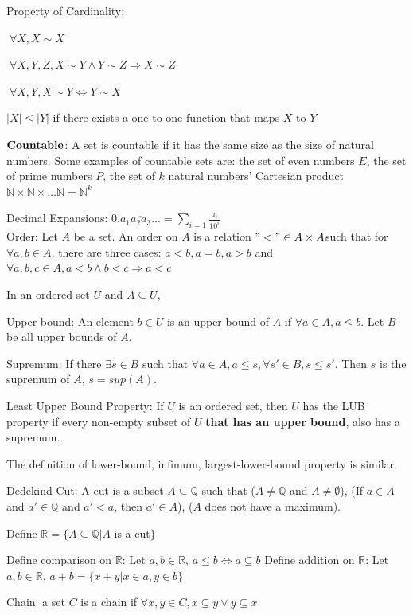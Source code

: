 \documentclass[12pt,a4paper]{ctexrep}
\begin{document}
Property of Cardinality: 

$\;\forall X, X \sim X$

$\;\forall X,Y,Z, X\sim Y \wedge Y\sim Z \Rightarrow X \sim Z$

$\;\forall X,Y, X\sim Y \Leftrightarrow Y \sim X$

$|X|\leqslant|Y|$ if there exists a one to one function that maps $X$ to $Y$

$\bold{Countable}$: A set is countable if it has the same size as the size of natural numbers. Some examples of countable sets are: the set of even numbers $E$, the set of prime numbers $P$, the set of $k$ natural numbers' Cartesian product $\mathbb{N} \times \mathbb{N} \times \dots\mathbb{N} = \mathbb{N}^k$

Decimal Expansions: 0.$\overline{a_1a_2a_3\dots} = \sum_{i=1} \frac{a_i}{10^i}$\\

Order: Let $A$ be a set. An order on $A$ is a relation $"<"\in A\times A$such that for $\forall a,b \in A$, there are three cases: $a<b,a=b,a>b$ and $\forall a,b,c \in A, a<b \wedge b<c \Rightarrow a<c$

In an ordered set $U$ and $A \subseteq U$,

Upper bound: An element $b \in U$ is an upper bound of $A$ if $\forall a \in A, a \leqslant b$. Let $B$ be all upper bounds of $A$.

Supremum: If there $\exists s \in B$ such that $\forall a \in A, a \leqslant s, \forall s' \in B, s \leqslant s'$. Then $s$ is the supremum of $A$, $s = sup(A)$.

Least Upper Bound Property: If $U$ is an ordered set, then $U$ has the LUB property if every non-empty subset of $U$ \textbf{that has an upper bound}, also has a supremum.

The definition of lower-bound, infimum, largest-lower-bound property is similar.

Dedekind Cut: A cut is a subset $A \subseteq \mathbb{Q}$ such that ($A \neq \mathbb{Q}$ and $A \neq \emptyset$), (If $a \in A$ and $a' \in \mathbb{Q}$ and $a' < a$, then $a' \in A$), ($A$ does not have a maximum).

Define $\mathbb{R} = \{A \subseteq \mathbb{Q}|A$ is a cut$\}$

Define comparison on $\mathbb{R}$: Let $a,b \in \mathbb{R}$, $a \leqslant b \iff a \subseteq b$
Define addition on $\mathbb{R}$: Let $a,b \in \mathbb{R}$, $a+b = \{x+y|x \in a, y \in b\}$

Chain: a set $C$ is a chain if $\forall x,y \in C, x \subseteq y \vee y \subseteq x$
\end{document}
